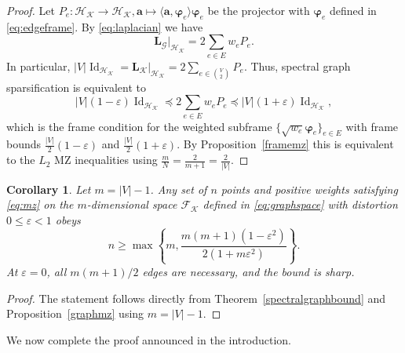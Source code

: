 \documentclass[a4paper]{amsart}
\numberwithin{equation}{section}
\newtheorem{corollary}[theorem]{Corollary}
\DeclareMathOperator{\Id}{Id}
\begin{document}
\begin{proof}
    Let $P_e\colon\mathcal H_{\mathcal K}\to\mathcal H_{\mathcal K}, \bm a\mapsto \langle\bm a,\bm\varphi_e\rangle\bm\varphi_e$ be the projector with $\bm\varphi_e$ defined in \eqref{eq:edgeframe}.
    By \eqref{eq:laplacian} we have
    \begin{equation*}
        \bm L_{\mathcal G} |_{\mathcal H_{\mathcal K}}
        = 2\sum_{e\in E} w_e P_e .
    \end{equation*}
    In particular, $|V|\Id_{\mathcal H_{\mathcal K}} = \bm L_{\mathcal K}|_{\mathcal H_{\mathcal K}} = 2\sum_{e\in\binom{V}{2}}P_e$.
    Thus, spectral graph sparsification is equivalent to
    \begin{equation*}
        |V|(1-\varepsilon)\Id_{\mathcal H_{\mathcal K}}
        \preceq 2\sum_{e\in E} w_e P_e
        \preceq |V|(1+\varepsilon)\Id_{\mathcal H_{\mathcal K}},
    \end{equation*}
    which is the frame condition for the weighted subframe $\{\sqrt{w_e}\bm\varphi_e\}_{e\in E}$ with frame bounds $\frac{|V|}{2}(1-\varepsilon)$ and $\frac{|V|}{2}(1+\varepsilon)$.
    By Proposition~\ref{framemz} this is equivalent to the $L_2$ MZ inequalities using $\frac mN = \frac{2}{m+1} = \frac{2}{|V|}$.
\end{proof}

\begin{corollary}\label{graphmzbound}
    Let $m={|V|}-1$.
    Any set of $n$ points and positive weights satisfying \eqref{eq:mz} on the $m$-dimensional space $\mathcal F_{\mathcal K}$ defined in \eqref{eq:graphspace} with distortion $0\le \varepsilon < 1$ obeys
    \begin{equation}\label{eq:unconditional-mz-lower}
        n\ge
        \max\left\{
        m,
        \frac{m(m+1)(1-\varepsilon^2)}
             {2(1+m\varepsilon^2)}
        \right\}.
    \end{equation}
    At $\varepsilon=0$, all $m(m+1)/2$ edges are necessary, and the bound is sharp.
\end{corollary}

\begin{proof}
    The statement follows directly from Theorem~\ref{spectralgraphbound} and Proposition~\ref{graphmz} using $m = |V|-1$.
\end{proof}

We now complete the proof announced in the introduction.
\end{document}
